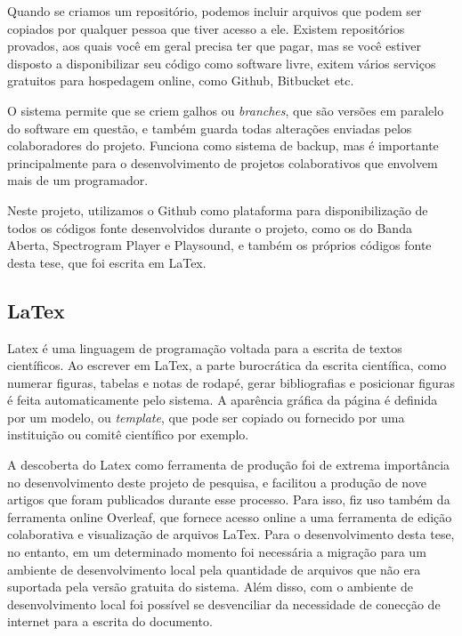 Quando se criamos um repositório, podemos incluir arquivos que podem ser copiados por qualquer pessoa que tiver acesso a ele. Existem repositórios provados, aos quais você em geral precisa ter que pagar, mas se você estiver disposto a disponibilizar seu código como software livre, exitem vários serviços gratuitos para hospedagem online, como Github, Bitbucket etc. 

O sistema permite que se criem galhos ou \emph{branches}, que são versões em paralelo do software em questão, e também guarda todas alterações enviadas pelos colaboradores do projeto. Funciona como sistema de backup, mas é importante principalmente para o desenvolvimento de projetos colaborativos que envolvem mais de um programador. 

Neste projeto, utilizamos o Github como plataforma para disponibilização de todos os códigos fonte desenvolvidos durante o projeto, como os do Banda Aberta, Spectrogram Player e Playsound, e também os próprios códigos fonte desta tese, que foi escrita em LaTex.

\subsection{LaTex}

Latex é uma linguagem de programação voltada para a escrita de textos científicos. Ao escrever em LaTex, a parte burocrática da escrita científica, como numerar figuras, tabelas e notas de rodapé, gerar bibliografias e posicionar figuras é feita automaticamente pelo sistema. A aparência gráfica da página é definida por um modelo, ou \emph{template}, que pode ser copiado ou fornecido por uma instituição ou comitê científico por exemplo.

A descoberta do Latex como ferramenta de produção foi de extrema importância no desenvolvimento deste projeto de pesquisa, e facilitou a produção de nove artigos que foram publicados durante esse processo. Para isso, fiz uso também da ferramenta online Overleaf, que fornece acesso online a uma ferramenta de edição colaborativa e visualização de arquivos LaTex. Para o desenvolvimento desta tese, no entanto, em um determinado momento foi necessária a migração para um ambiente de desenvolvimento local pela quantidade de arquivos que não era suportada pela versão gratuita do sistema. Além disso, com o ambiente de desenvolvimento local foi possível se desvenciliar da necessidade de conecção de internet para a escrita do documento.

\subsection{}




\subsubsection{ }




